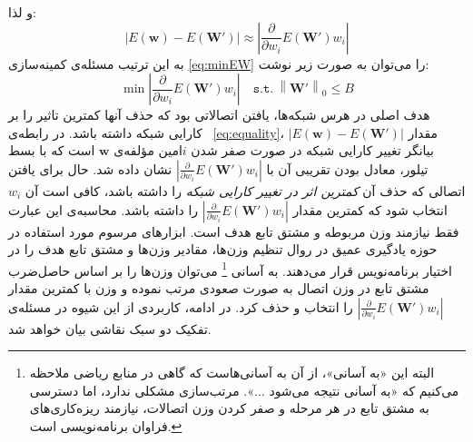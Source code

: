 \documentclass[11pt, twoside]{imsproc}
\newcommand{\norm}[1]{\left\lVert#1\right\rVert}
\begin{document}
و لذا:
\begin{equation}
|E(\mathbf{w})-E(\mathbf{W'})| \approx  \left|\frac{\partial}{\partial w_i}E(\mathbf{W'})w_i\right|
\label{eq:equality}
\end{equation}
به این ترتیب مسئله‌ی کمینه‌سازی
\eqref{eq:minEW}
را می‌توان به صورت زیر نوشت:
\begin{equation}
\min \left|\frac{\partial}{\partial w_i}E(\mathbf{W'})w_i\right| \quad \mathtt{s.t.}\  \norm{\mathbf{W'}}_0 \le B
\label{eq:minREW}
\end{equation}
 هدف اصلی در هرس شبکه‌ها، یافتن اتصالاتی بود که حذف آنها کمترین تاثیر را بر کارایی شبکه داشته باشد.
 در رابطه‌ی
~\eqref{eq:equality}، 
مقدار
$|E(\mathbf{w})-E(\mathbf{W'})|$
بیانگر تغییر کارایی شبکه در صورت صفر شدن
$i$امین
مؤلفه‌ی
$\mathbf{w}$
است که با بسط تیلور،
معادل بودن تقریبی آن با
$\left|\frac{\partial}{\partial w_i}E(\mathbf{W'})w_i\right|$
نشان داده شد.
حال برای یافتن اتصالی که حذف آن
\textit{
  کمترین اثر در تغییر کارایی شبکه } را داشته باشد، کافی است آن
$w_i$
انتخاب شود که  کمترین مقدار
$\left|\frac{\partial}{\partial w_i}E(\mathbf{W'})w_i\right|$
را داشته باشد.
 محاسبه‌ی این عبارت فقط نیازمند وزن مربوطه و مشتق تابع هدف  است. ابزارهای مرسوم مورد استفاده در حوزه یادگیری عمیق
در روال تنظیم وزن‌ها، مقادیر وزن‌ها و مشتق تابع هدف را  در اختیار برنامه‌نویس قرار می‌دهند. %
به آسانی%
\footnote{
البته این «به آسانی»، از آن به آسانی‌هاست که گاهی در منابع ریاضی ملاحظه می‌کنیم که «به آسانی نتیجه می‌شود
$\dots$».
مرتب‌سازی مشکلی ندارد، اما دسترسی به مشتق تابع در هر مرحله و صفر کردن وزن اتصالات، نیازمند ریزه‌کاری‌های فراوان برنامه‌نویسی است.
}
  می‌توان وزن‌ها را بر اساس حاصل‌ضرب مشتق تابع در وزن اتصال به صورت صعودی مرتب نموده و وزن با کمترین مقدار
 $\left|\frac{\partial}{\partial w_i}E(\mathbf{W'})w_i\right|$
   را انتخاب و حذف کرد.
در ادامه، کاربردی از این شیوه در مسئله‌ی تفکیک دو سبک نقاشی بیان خواهد شد.
%
\end{document}
